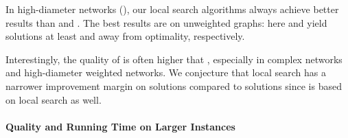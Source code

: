 In high-diameter networks (), our
local search algorithms always achieve better results than \greedyc and \gs. The
best results are on unweighted graphs: here \greedylsc and \gslsc yield
solutions at least \minQualLSGRRoadUnw and \minQualLSGSRoadUnw away from
optimality, respectively.

Interestingly, the quality of \greedylsc is often higher that \gslsc,
especially in complex networks and high-diameter weighted networks.
We conjecture that local search has a narrower improvement margin on
\gs solutions compared to \greedyc solutions since \gs is based
on local search as well.

\paragraph{Quality and Running Time on Larger Instances}
%
